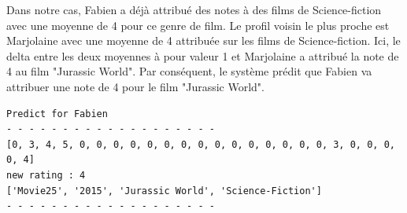 \vspace{5mm}

Dans notre cas, Fabien a déjà attribué des notes à des films de Science-fiction avec une moyenne de 4 pour ce genre de film. Le profil voisin le plus proche est Marjolaine avec une moyenne de 4 attribuée sur les films de Science-fiction. Ici, le delta entre les deux moyennes à pour valeur 1 et Marjolaine a attribué la note de 4 au film "Jurassic World". Par conséquent, le système prédit que Fabien va attribuer une note de 4 pour le film "Jurassic World". 

\begin{verbatim}
Predict for Fabien
- - - - - - - - - - - - - - - - - - -
[0, 3, 4, 5, 0, 0, 0, 0, 0, 0, 0, 0, 0, 0, 0, 0, 0, 0, 0, 3, 0, 0, 0, 0, 4]
new rating : 4  
['Movie25', '2015', 'Jurassic World', 'Science-Fiction']
- - - - - - - - - - - - - - - - - - -
\end{verbatim}